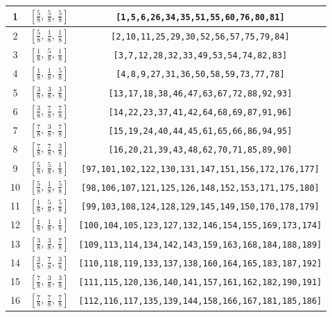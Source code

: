 \documentclass[fleqn,8pt]{jsarticle}
\begin{document}
\begin{longtable}{ccc}
1 & $\left[ \frac{5}{8},\, \frac{5}{8},\, \frac{5}{8} \right]$ & {\tt [1,5,6,26,34,35,51,55,60,76,80,81]} \\ \hline
2 & $\left[ \frac{5}{8},\, \frac{1}{8},\, \frac{1}{8} \right]$ & {\tt [2,10,11,25,29,30,52,56,57,75,79,84]} \\ \hline
3 & $\left[ \frac{1}{8},\, \frac{5}{8},\, \frac{1}{8} \right]$ & {\tt [3,7,12,28,32,33,49,53,54,74,82,83]} \\ \hline
4 & $\left[ \frac{1}{8},\, \frac{1}{8},\, \frac{5}{8} \right]$ & {\tt [4,8,9,27,31,36,50,58,59,73,77,78]} \\ \hline
5 & $\left[ \frac{3}{8},\, \frac{3}{8},\, \frac{3}{8} \right]$ & {\tt [13,17,18,38,46,47,63,67,72,88,92,93]} \\ \hline
6 & $\left[ \frac{3}{8},\, \frac{7}{8},\, \frac{7}{8} \right]$ & {\tt [14,22,23,37,41,42,64,68,69,87,91,96]} \\ \hline
7 & $\left[ \frac{7}{8},\, \frac{3}{8},\, \frac{7}{8} \right]$ & {\tt [15,19,24,40,44,45,61,65,66,86,94,95]} \\ \hline
8 & $\left[ \frac{7}{8},\, \frac{7}{8},\, \frac{3}{8} \right]$ & {\tt [16,20,21,39,43,48,62,70,71,85,89,90]} \\ \hline
9 & $\left[ \frac{5}{8},\, \frac{5}{8},\, \frac{1}{8} \right]$ & {\tt [97,101,102,122,130,131,147,151,156,172,176,177]} \\ \hline
10 & $\left[ \frac{5}{8},\, \frac{1}{8},\, \frac{5}{8} \right]$ & {\tt [98,106,107,121,125,126,148,152,153,171,175,180]} \\ \hline
11 & $\left[ \frac{1}{8},\, \frac{5}{8},\, \frac{5}{8} \right]$ & {\tt [99,103,108,124,128,129,145,149,150,170,178,179]} \\ \hline
12 & $\left[ \frac{1}{8},\, \frac{1}{8},\, \frac{1}{8} \right]$ & {\tt [100,104,105,123,127,132,146,154,155,169,173,174]} \\ \hline
13 & $\left[ \frac{3}{8},\, \frac{3}{8},\, \frac{7}{8} \right]$ & {\tt [109,113,114,134,142,143,159,163,168,184,188,189]} \\ \hline
14 & $\left[ \frac{3}{8},\, \frac{7}{8},\, \frac{3}{8} \right]$ & {\tt [110,118,119,133,137,138,160,164,165,183,187,192]} \\ \hline
15 & $\left[ \frac{7}{8},\, \frac{3}{8},\, \frac{3}{8} \right]$ & {\tt [111,115,120,136,140,141,157,161,162,182,190,191]} \\ \hline
16 & $\left[ \frac{7}{8},\, \frac{7}{8},\, \frac{7}{8} \right]$ & {\tt [112,116,117,135,139,144,158,166,167,181,185,186]} \\
\end{longtable}
\end{document}

